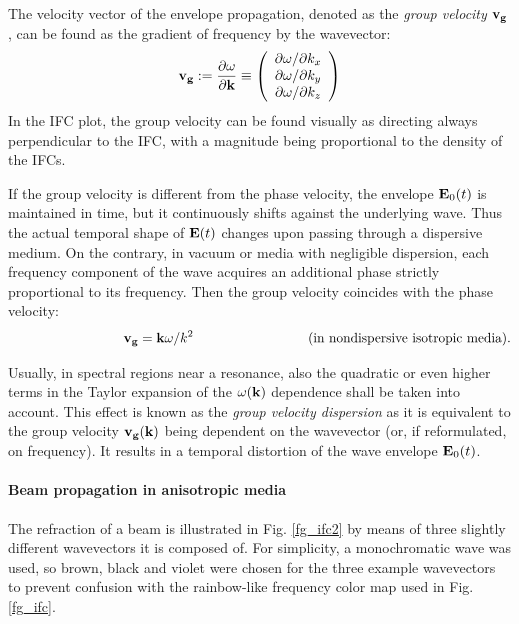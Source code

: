 The velocity vector of the envelope propagation, denoted as the \textit{group velocity} ${\mathbf{v_g}}$, can be found as the gradient of frequency by the wavevector: %
\begin{equation} {\mathbf{v_g}} := \frac{\partial \omega}{\partial {\mathbf{k}}} \equiv 
\left(\begin{array}{c} 
	\partial \omega/\partial k_x \\ 
	\partial \omega/\partial k_y \\ 
	\partial \omega/\partial k_z \\ 
	\end{array} \right)
 \label{eq_vg}\end{equation}
In the IFC plot, the group velocity can be found visually as directing always perpendicular to the IFC, with a magnitude being proportional to the density of the IFCs.

If the group velocity is different from the phase velocity, the envelope $\mathbf{E}_0(t)$ is maintained in time, but it continuously shifts against the underlying wave. Thus the actual temporal shape of $\mathbf{E}(t)$ changes upon passing through a dispersive medium.
On the contrary, in vacuum or media with negligible dispersion, each frequency component of the wave acquires an additional phase strictly proportional to its frequency. Then the group velocity coincides with the phase velocity: 
$$\hspace{3cm}\vg = \kk \omega / k^2 \hspace{3cm} \text{(in nondispersive isotropic media)}.$$

Usually, in spectral regions near a resonance, also the quadratic or even higher terms in the Taylor expansion of the $\omega({\mathbf{k}})$ dependence shall be taken into account. This effect is known as the \textit{group velocity dispersion} as it is equivalent to the group velocity ${\mathbf{v_g}}({\mathbf{k}})$ being dependent on the wavevector (or, if reformulated, on frequency). It results in a temporal distortion of the wave envelope $\mathbf{E}_0(t)$.  %
\paragraph{Beam propagation in anisotropic media}  %
The refraction of a beam is illustrated in Fig. \ref{fg_ifc2} by means of three slightly different wavevectors it is composed of. For simplicity, a monochromatic wave was used, so brown, black and violet were chosen for the three example wavevectors to prevent confusion with the rainbow-like frequency color map used in Fig. \ref{fg_ifc}. 

